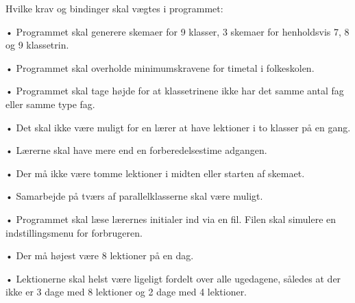 Hvilke krav og bindinger skal vægtes i programmet:


•	Programmet skal generere skemaer for 9 klasser, 3 skemaer for henholdsvis 7, 8 og 9 klassetrin.


•	Programmet skal overholde minimumskravene for timetal i folkeskolen.


•	Programmet skal tage højde for at klassetrinene ikke har det samme antal fag eller samme type fag.


•	Det skal ikke være muligt for en lærer at have lektioner i to klasser på en gang.


•	Lærerne skal have mere end en forberedelsestime adgangen.


•	Der må ikke være tomme lektioner i midten eller starten af skemaet.


•	Samarbejde på tværs af parallelklasserne skal være muligt. 


•	Programmet skal læse lærernes initialer ind via en fil. Filen skal simulere en indstillingsmenu for forbrugeren.


•	Der må højest være 8 lektioner på en dag.


•	Lektionerne skal helst være ligeligt fordelt over alle ugedagene, således at der ikke er 3 dage med 8 lektioner og 2 dage med 4 lektioner.
